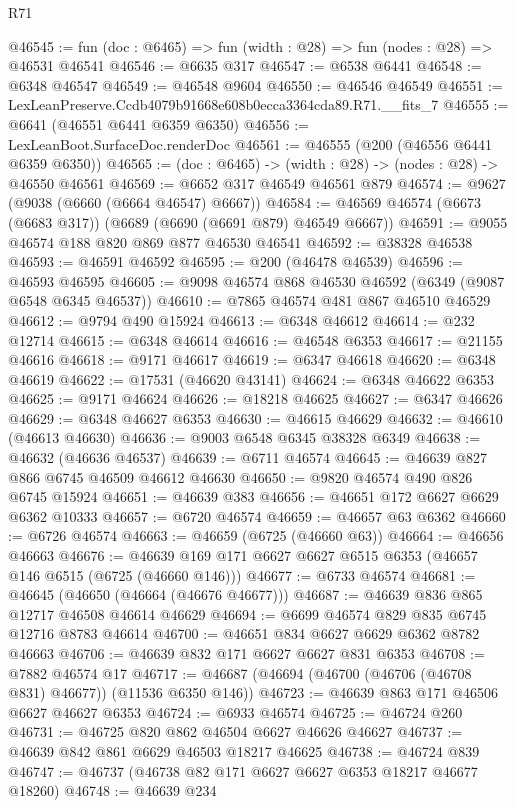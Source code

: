 \begin{lexlean}{R71}
\begin{coremodule}
@46545 := fun (doc : @6465) => fun (width : @28) => fun (nodes : @28) => @46531 @46541
@46546 := @6635 @317
@46547 := @6538 @6441
@46548 := @6348 @46547
@46549 := @46548 @9604
@46550 := @46546 @46549
@46551 := LexLeanPreserve.Ccdb4079b91668e608b0ecca3364cda89.R71.__fits_7
@46555 := @6641 (@46551 @6441 @6359 @6350)
@46556 := LexLeanBoot.SurfaceDoc.renderDoc
@46561 := @46555 (@200 (@46556 @6441 @6359 @6350))
@46565 := (doc : @6465) -> (width : @28) -> (nodes : @28) -> @46550 @46561
@46569 := @6652 @317 @46549 @46561 @879
@46574 := @9627 (@9038 (@6660 (@6664 @46547) @6667))
@46584 := @46569 @46574 (@6673 (@6683 @317)) (@6689 (@6690 (@6691 @879) @46549 @6667))
@46591 := @9055 @46574 @188 @820 @869 @877 @46530 @46541
@46592 := @38328 @46538
@46593 := @46591 @46592
@46595 := @200 (@46478 @46539)
@46596 := @46593 @46595
@46605 := @9098 @46574 @868 @46530 @46592 (@6349 (@9087 @6548 @6345 @46537))
@46610 := @7865 @46574 @481 @867 @46510 @46529
@46612 := @9794 @490 @15924
@46613 := @6348 @46612
@46614 := @232 @12714
@46615 := @6348 @46614
@46616 := @46548 @6353
@46617 := @21155 @46616
@46618 := @9171 @46617
@46619 := @6347 @46618
@46620 := @6348 @46619
@46622 := @17531 (@46620 @43141)
@46624 := @6348 @46622 @6353
@46625 := @9171 @46624
@46626 := @18218 @46625
@46627 := @6347 @46626
@46629 := @6348 @46627 @6353
@46630 := @46615 @46629
@46632 := @46610 (@46613 @46630)
@46636 := @9003 @6548 @6345 @38328 @6349
@46638 := @46632 (@46636 @46537)
@46639 := @6711 @46574
@46645 := @46639 @827 @866 @6745 @46509 @46612 @46630
@46650 := @9820 @46574 @490 @826 @6745 @15924
@46651 := @46639 @383
@46656 := @46651 @172 @6627 @6629 @6362 @10333
@46657 := @6720 @46574
@46659 := @46657 @63 @6362
@46660 := @6726 @46574
@46663 := @46659 (@6725 (@46660 @63))
@46664 := @46656 @46663
@46676 := @46639 @169 @171 @6627 @6627 @6515 @6353 (@46657 @146 @6515 (@6725 (@46660 @146)))
@46677 := @6733 @46574
@46681 := @46645 (@46650 (@46664 (@46676 @46677)))
@46687 := @46639 @836 @865 @12717 @46508 @46614 @46629
@46694 := @6699 @46574 @829 @835 @6745 @12716 @8783 @46614
@46700 := @46651 @834 @6627 @6629 @6362 @8782 @46663
@46706 := @46639 @832 @171 @6627 @6627 @831 @6353
@46708 := @7882 @46574 @17
@46717 := @46687 (@46694 (@46700 (@46706 (@46708 @831) @46677)) (@11536 @6350 @146))
@46723 := @46639 @863 @171 @46506 @6627 @46627 @6353
@46724 := @6933 @46574
@46725 := @46724 @260
@46731 := @46725 @820 @862 @46504 @6627 @46626 @46627
@46737 := @46639 @842 @861 @6629 @46503 @18217 @46625
@46738 := @46724 @839
@46747 := @46737 (@46738 @82 @171 @6627 @6627 @6353 @18217 @46677 @18260)
@46748 := @46639 @234

\end{coremodule}
\end{lexlean}
